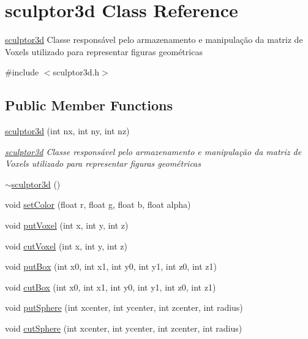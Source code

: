 \hypertarget{classsculptor3d}{}\section{sculptor3d Class Reference}
\label{classsculptor3d}


\hyperlink{classsculptor3d}{sculptor3d} Classe responsável pelo armazenamento e manipulação da matriz de Voxels utilizado para representar figuras geométricas  




{\ttfamily \#include $<$sculptor3d.\+h$>$}

\subsection*{Public Member Functions}
\begin{DoxyCompactItemize}
\item 
\hyperlink{classsculptor3d_a36be08ef50a69161c1332f4a1cff226c}{sculptor3d} (int nx, int ny, int nz)
\begin{DoxyCompactList}\small\item\em \hyperlink{classsculptor3d}{sculptor3d} Classe responsável pelo armazenamento e manipulação da matriz de Voxels utilizado para representar figuras geométricas \end{DoxyCompactList}\item 
\hyperlink{classsculptor3d_ac0aa5ebfa033c54aad6a8d995ecbede8}{$\sim$sculptor3d} ()
\item 
void \hyperlink{classsculptor3d_aba9db4181e1087a09f1de6eee3d03705}{set\+Color} (float r, float g, float b, float alpha)
\item 
void \hyperlink{classsculptor3d_a15cb3ad622cf1b85f3c5811af1fe1ff3}{put\+Voxel} (int x, int y, int z)
\item 
void \hyperlink{classsculptor3d_a3bc32c45bd4de88a0316e709e63fb54f}{cut\+Voxel} (int x, int y, int z)
\item 
void \hyperlink{classsculptor3d_a33ad346684939cacea6c469afad99ffd}{put\+Box} (int x0, int x1, int y0, int y1, int z0, int z1)
\item 
void \hyperlink{classsculptor3d_ac92f60c7e3fd6ec3df820ddd118d7918}{cut\+Box} (int x0, int x1, int y0, int y1, int z0, int z1)
\item 
void \hyperlink{classsculptor3d_a81b399736b253ef298e7cf04feed9607}{put\+Sphere} (int xcenter, int ycenter, int zcenter, int radius)
\item 
void \hyperlink{classsculptor3d_a1e8bf7a173f21c6fd805291ae76e94e8}{cut\+Sphere} (int xcenter, int ycenter, int zcenter, int radius)

\end{DoxyCompactItemize}
